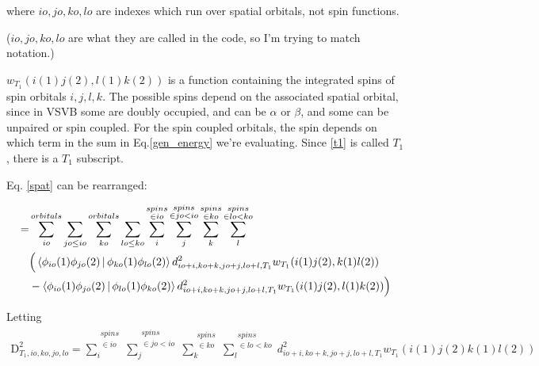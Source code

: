 \documentclass[a4paper]{article}
\begin{document}
where $io,jo,ko,lo$ are indexes which run over spatial orbitals, not spin functions.

($io,jo,ko,lo$ are what they are called in the code, so I'm trying to match notation.)


$w_{T_1}( i(1) j(2), l(1) k(2) )$ is a function containing the integrated spins of spin orbitals $i,j,l,k$. The possible spins depend on the associated spatial orbital, since in VSVB some are doubly occupied, and can be $\alpha$ or $\beta$, and some can be unpaired or spin coupled. For the spin coupled orbitals, the spin depends on which term in the sum in Eq.\ref{gen_energy} we're evaluating. Since \ref{t1} is called $T_1$, there is a $T_1$ subscript.

Eq. \ref{spat} can be rearranged:

\begin{equation}
 \begin{aligned}
          =& \sum_{io}^{orbitals}\sum_{jo\leq io}\sum_{ko}^{orbitals}\sum_{lo\leq ko}                                                                                                                                         
   \sum_i^{\substack{spins \\ \in io}}\sum_j^{\substack{spins \\ \in jo<io}}\sum_k^{\substack{spins \\ \in ko}}  
   \sum_l^{\substack{spins \\ \in lo<ko}}      \\                                                                                                                                                  
    & \Big( \Braket{ \phi_{io}(1) \phi_{jo}(2) | \phi_{ko}(1) \phi_{lo}(2) }d^2_{io+i,ko+k,jo+j,lo+l,T_1} w_{T_1}( i(1) j(2), k(1) l(2) )        \\                                                                                                                                       
    &-  \Braket{ \phi_{io}(1) \phi_{jo}(2) | \phi_{lo}(1) \phi_{ko}(2) } d^2_{io+i,ko+k,jo+j,lo+l,T_1} w_{T_1}( i(1) j(2), l(1) k(2) )  \Big)
\label{rearr_single}
    \end{aligned}
     \end{equation}

Letting 
\begin{equation}
 \begin{aligned}
 	\text{D}_{T_1, io,ko,jo,lo}^2 =                                                                                                                                                                 
       \sum_i^{\substack{spins \\ \in io}}\sum_j^{\substack{spins \\ \in jo<io}}\sum_k^{\substack{spins \\ \in ko}}                                                                                                                                            
   \sum_l^{\substack{spins \\ \in lo<ko}} d^2_{io+i,ko+k,jo+j,lo+l,T_1} w_{T_1}(i(1) j(2) k(1) l(2))
     \end{aligned}
     \end{equation}
     
\end{document}
